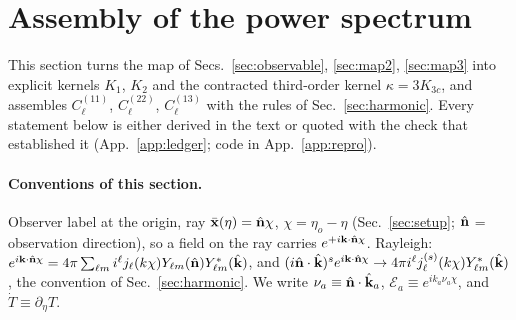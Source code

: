 \section{Assembly of the power spectrum}
\label{sec:assembly}
This section turns the map of Secs.~\ref{sec:observable}, \ref{sec:map2}, \ref{sec:map3} into explicit kernels
$K_1$, $K_2$ and the contracted third-order kernel $\kappa=3K_{3c}$, and assembles $C^{(11)}_\ell$, $C^{(22)}_\ell$, $C^{(13)}_\ell$ with the rules of
Sec.~\ref{sec:harmonic}.  Every statement below is either derived in the text or quoted with the check that established it
(App.~\ref{app:ledger}; code in App.~\ref{app:repro}).

\paragraph{Conventions of this section.}  Observer label at the origin, ray $\bar{\mathbf x}(\eta)=\hat{\mathbf n}\chi$, $\chi=\eta_o-\eta$
(Sec.~\ref{sec:setup}; $\hat{\mathbf n}$ = observation direction), so a field on the ray carries $e^{+i\mathbf k\cdot\hat{\mathbf n}\chi}$.  Rayleigh:
$e^{i\mathbf k\cdot\hat{\mathbf n}\chi}=4\pi\sum_{\ell m}i^\ell j_\ell(k\chi)Y_{\ell m}(\hat{\mathbf n})Y^*_{\ell m}(\hat{\mathbf k})$, and
$(i\hat{\mathbf n}\cdot\hat{\mathbf k})^s e^{i\mathbf k\cdot\hat{\mathbf n}\chi}\to4\pi i^\ell j^{(s)}_\ell(k\chi)Y^*_{\ell m}(\hat{\mathbf k})$, the convention of
Sec.~\ref{sec:harmonic}.  We write
$\nu_a\equiv\hat{\mathbf n}\cdot\hat{\mathbf k}_a$, $\mathcal E_a\equiv e^{ik_a\nu_a\chi}$, and $\dot T\equiv\partial_\eta T$.

